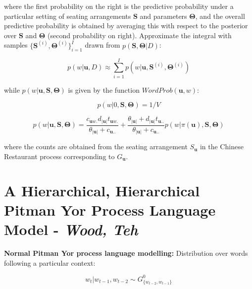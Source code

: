 \noindent where the first probability on the right is the predictive probability under a particular setting of seating arrangements $\boldsymbol{S}$ and parameters $\boldsymbol\Theta$, and the overall predictive probability is obtained by averaging this with respect to the posterior over $\boldsymbol{S}$ and $\boldsymbol\Theta$ (second probability on right). Approximate the integral with samples $\{\boldsymbol S^{(i)}, \boldsymbol\Theta^{(i)}\}_{i=1}^{I}$ drawn from $p(\boldsymbol S, \boldsymbol\Theta |D)$:

\begin{equation}
p(w|\boldsymbol u, D)\approx \sum_{i=1}^{I}p(w|\boldsymbol u, \boldsymbol S^{(i)}, \boldsymbol \Theta ^{(i)})
\label{eq:mcmcIntegralApprox}
\end{equation}

\noindent while $p(w|\boldsymbol u, \boldsymbol S, \boldsymbol \Theta)$ is given by the function $WordProb(\boldsymbol u, w)$:

\begin{equation}
p(w|0, \boldsymbol S, \boldsymbol \Theta)=1/V
\label{eq:mcmcWordProb1}
\end{equation}

\begin{equation}
p(w|\boldsymbol u, \boldsymbol S, \boldsymbol \Theta)=\frac{c_{\boldsymbol u w.}d_{|\boldsymbol u |}t_{\boldsymbol u w.}}{\theta_{|\boldsymbol u |}+c_{\boldsymbol u ..}} + \frac{\theta_{|\boldsymbol u |}+d_{|\boldsymbol u |}t_{\boldsymbol u ..}}{\theta_{|\boldsymbol u |}+c_{\boldsymbol u ..}}p(w|\pi(\boldsymbol u), \boldsymbol S, \boldsymbol \Theta)
\label{eq:mcmcWordProb2}
\end{equation}

\noindent where the counts are obtained from the seating arrangement $S_{\boldsymbol u}$ in the Chinese Restaurant process corresponding to $G_{\boldsymbol u}$.

\section{A Hierarchical, Hierarchical Pitman Yor Process Language Model - \textit{Wood, Teh}}

\textbf{Normal Pitman Yor process language modelling:} Distribution over words following a particular context:

\begin{equation}
w_{t}|w_{t-1}, w_{t-2} \sim G_{\{w_{t-2},w_{t-1}\}}^{0}
\label{eq:PYWordDistribution}
\end{equation}

